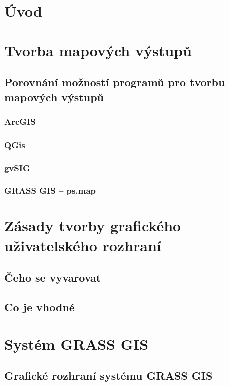 \documentclass[a4paper,12pt,draft]{article}
\author{Anna Kratochvílová}
\begin{document}
\tableofcontents
\section{Úvod}

\section{Tvorba mapových výstupů}

\subsection{Porovnání možností programů pro tvorbu mapových výstupů}

\subsubsection{ArcGIS}

\subsubsection{QGis}

\subsubsection{gvSIG}

\subsubsection{GRASS GIS -- ps.map}
\label{sec:porovnani:psmap}

\section{Zásady tvorby grafického uživatelského rozhraní}
\subsection{Čeho se vyvarovat}
\subsection{Co je vhodné}


\section{Systém GRASS GIS}

\subsection{Grafické rozhraní systému GRASS GIS}
\end{document}
